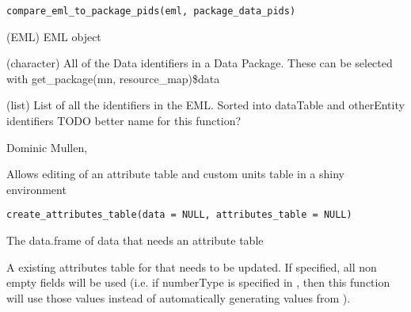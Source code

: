 \documentclass[letterpaper]{book}
\begin{document}
%
\begin{Usage}
\begin{verbatim}
compare_eml_to_package_pids(eml, package_data_pids)
\end{verbatim}
\end{Usage}
%
\begin{Arguments}
\begin{ldescription}
\item[\code{eml}] (EML) EML object

\item[\code{package\_data\_pids}] (character) All of the Data identifiers in a Data
Package.  These can be selected with get\_package(mn, resource\_map)\$data
\end{ldescription}
\end{Arguments}
%
\begin{Value}
(list) List of all the identifiers in the EML.  Sorted into dataTable
and otherEntity identifiers
TODO better name for this function?
\end{Value}
%
\begin{Author}\relax
Dominic Mullen, 
\end{Author}
%
\begin{Description}\relax
Allows editing of an attribute table and custom units table in a shiny environment
\end{Description}
%
\begin{Usage}
\begin{verbatim}
create_attributes_table(data = NULL, attributes_table = NULL)
\end{verbatim}
\end{Usage}
%
\begin{Arguments}
\begin{ldescription}
\item[\code{data}] The data.frame of data that needs an attribute table

\item[\code{attributes\_table}] A existing attributes table for  that needs to be updated. If specified, all non empty fields will be used (i.e. if numberType is specified in , then this function will use those values instead of automatically generating values from ).
\end{ldescription}
\end{Arguments}
\end{document}
